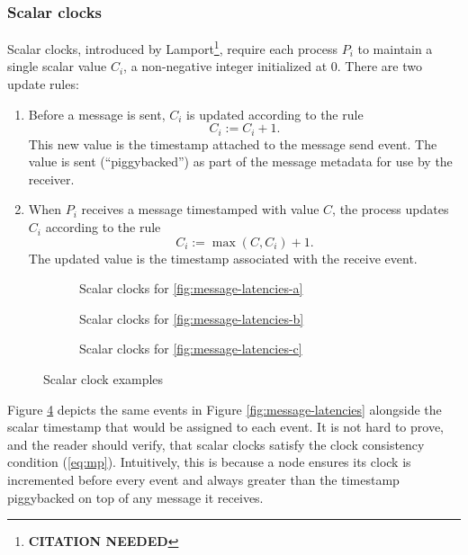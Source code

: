 \documentclass[]             %
{NASA}                       %
\theoremstyle{definition}
\newcommand{\citationneeded}{\footnote{\textbf{CITATION NEEDED}}}
\begin{document}

\subsubsection{Scalar clocks}
Scalar clocks, introduced by Lamport\citationneeded, require each
process $P_i$ to maintain a single scalar value $C_i$, a non-negative
integer initialized at $0$. There are two update rules:
\begin{enumerate}
\item Before a message is sent, $C_i$ is updated according to the rule
  \[C_i := C_i + 1.\]
  This new value is the timestamp attached to the message send
  event. The value is sent (``piggybacked'') as part of the message
  metadata for use by the receiver.
\item When $P_i$ receives a message timestamped with value $C$, the
  process updates $C_i$ according to the rule
  \[C_i := \max(C, C_i) + 1.\]
  The updated value is the timestamp associated with the receive
  event.
\end{enumerate}

\begin{figure}[p]
  \setlength\belowcaptionskip{5ex}

  \begin{subfigure}{1\textwidth}
    \centering 
    \caption{Scalar clocks for \ref{fig:message-latencies-a}}
    \label{fig:message-latencies-scalar-a}
  \end{subfigure}

  \begin{subfigure}{1\textwidth}
    \centering 
    \caption{Scalar clocks for \ref{fig:message-latencies-b}}
    \label{fig:message-latencies-scalar-b}
  \end{subfigure}


  \begin{subfigure}{1\textwidth}
    \centering 
    \caption{Scalar clocks for \ref{fig:message-latencies-c}}
    \label{fig:message-latencies-scalar-c}
  \end{subfigure}
  \caption{Scalar clock examples}
  \label{fig:message-latencies-scalar}
\end{figure}

\afterpage{\clearpage}

Figure \ref{fig:message-latencies-scalar} depicts the same events in
Figure \ref{fig:message-latencies} alongside the scalar timestamp that
would be assigned to each event. It is not hard to prove, and the
reader should verify, that scalar clocks satisfy the clock consistency
condition (\ref{eq:mp}). Intuitively, this is because a node ensures
its clock is incremented before every event and always greater than
the timestamp piggybacked on top of any message it receives.
\end{document}
